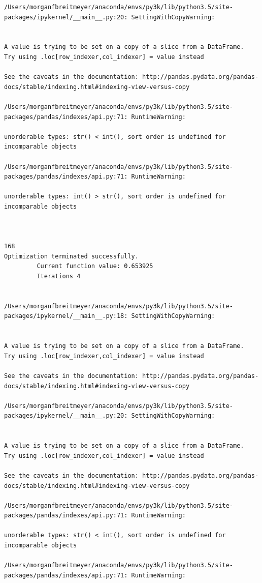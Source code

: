 \begin{lstlisting}
/Users/morganfbreitmeyer/anaconda/envs/py3k/lib/python3.5/site-packages/ipykernel/__main__.py:20: SettingWithCopyWarning:


A value is trying to be set on a copy of a slice from a DataFrame.
Try using .loc[row_indexer,col_indexer] = value instead

See the caveats in the documentation: http://pandas.pydata.org/pandas-docs/stable/indexing.html#indexing-view-versus-copy

/Users/morganfbreitmeyer/anaconda/envs/py3k/lib/python3.5/site-packages/pandas/indexes/api.py:71: RuntimeWarning:

unorderable types: str() < int(), sort order is undefined for incomparable objects

/Users/morganfbreitmeyer/anaconda/envs/py3k/lib/python3.5/site-packages/pandas/indexes/api.py:71: RuntimeWarning:

unorderable types: int() > str(), sort order is undefined for incomparable objects



168
Optimization terminated successfully.
         Current function value: 0.653925
         Iterations 4


/Users/morganfbreitmeyer/anaconda/envs/py3k/lib/python3.5/site-packages/ipykernel/__main__.py:18: SettingWithCopyWarning:


A value is trying to be set on a copy of a slice from a DataFrame.
Try using .loc[row_indexer,col_indexer] = value instead

See the caveats in the documentation: http://pandas.pydata.org/pandas-docs/stable/indexing.html#indexing-view-versus-copy

/Users/morganfbreitmeyer/anaconda/envs/py3k/lib/python3.5/site-packages/ipykernel/__main__.py:20: SettingWithCopyWarning:


A value is trying to be set on a copy of a slice from a DataFrame.
Try using .loc[row_indexer,col_indexer] = value instead

See the caveats in the documentation: http://pandas.pydata.org/pandas-docs/stable/indexing.html#indexing-view-versus-copy

/Users/morganfbreitmeyer/anaconda/envs/py3k/lib/python3.5/site-packages/pandas/indexes/api.py:71: RuntimeWarning:

unorderable types: str() < int(), sort order is undefined for incomparable objects

/Users/morganfbreitmeyer/anaconda/envs/py3k/lib/python3.5/site-packages/pandas/indexes/api.py:71: RuntimeWarning:


\end{lstlisting}
